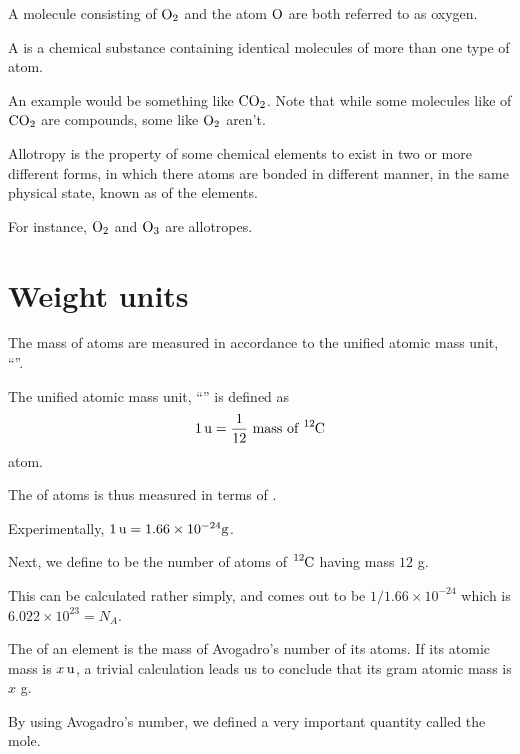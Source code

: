 A molecule consisting of \(\ce{O2}\) and the atom \(\ce{O}\) are both referred to as
oxygen. 

\begin{definition}
    A  is a chemical substance containing identical molecules of 
    more than one type of atom.
\end{definition}

An example would be something like \(\ce{CO2}\). Note that while 
some molecules like of \(\ce{CO2}\) are compounds, some like \(\ce{O2}\) aren't.

\begin{definition}
    Allotropy is the property of some chemical elements to exist in two or more different forms, 
    in which there atoms are bonded in different manner, in the same physical state, known as  of the elements.
\end{definition}

For instance, \(\ce{O2}\) and \(\ce{O3}\) are allotropes. 

\section{Weight units}

The mass of atoms are measured in accordance to
the unified atomic mass unit, ``\uch''.

\begin{definition}
    The unified atomic mass unit, ``\uch'' is defined as
    \[1 \uch = \frac{1}{12} \text{ mass of } \ce{^12C}\] 
    atom.
\end{definition}

The  of atoms 
is thus measured in terms of \uch.

Experimentally, \(1 \,{\mathrm{u}} = 1.66 \times 10^{-24} \si{\gram}\). 

Next, we define  to be the 
number of atoms of \(\ce{^12C}\) having mass \(12\) \si{\gram}.

This can be calculated rather simply, and comes out to be \(1/1.66 \times 10^{-24}\)
which is \(6.022 \times 10^23 = N_A\).

The  of an element is the
mass of Avogadro's number of its atoms. If its atomic mass is \(x \,{\mathrm{u}}\), 
a trivial calculation leads us to conclude that its gram atomic mass is
\(x\) \si{\gram}.

By using Avogadro's number, we defined a very important quantity called
the mole.

